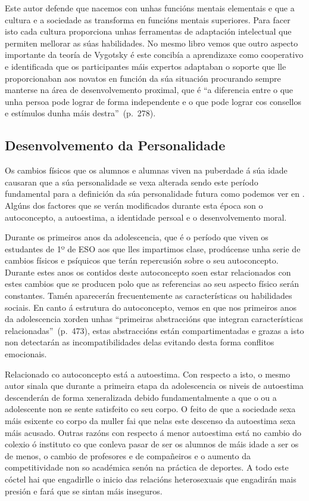 Este autor defende que nacemos con unhas funcións mentais elementais e que a cultura e a sociedade as transforma en funcións mentais superiores. Para facer isto cada cultura proporciona unhas ferramentas de adaptación intelectual que permiten mellorar as súas habilidades. No mesmo libro vemos que outro aspecto importante da teoría de Vygotsky é este concibía a aprendizaxe como cooperativo e identificada que os participantes máis expertos adaptaban o soporte que lle proporcionaban aos novatos en función da súa situación procurando sempre manterse na área de desenvolvemento proximal, que é ``a diferencia entre o que unha persoa pode lograr de forma independente e o que pode lograr cos consellos e estímulos dunha máis destra''~(p.~278).

\subsection{Desenvolvemento da Personalidade}
Os cambios físicos que os alumnos e alumnas viven na puberdade á súa idade causaran que a súa personalidade se vexa alterada sendo este período fundamental para a definición da súa personalidade futura como podemos ver en . Algúns dos factores que se verán modificados durante esta época son o autoconcepto, a autoestima, a identidade persoal e o desenvolvemento moral.

Durante os primeiros anos da adolescencia, que é o período que viven os estudantes de 1º de ESO aos que lles impartimos clase, prodúcense unha serie de cambios físicos e psíquicos que terán repercusión sobre o seu autoconcepto. Durante estes anos os contidos deste autoconcepto soen estar relacionados con estes cambios que se producen polo que as referencias ao seu aspecto físico serán constantes. Tamén aparecerán frecuentemente as características ou habilidades sociais. En canto á estrutura do autoconcepto, vemos en  que nos primeiros anos da adolescencia xorden unhas ``primeiras abstraccións que integran características relacionadas''~(p.~473), estas abstraccións están compartimentadas e grazas a isto non detectarán as incompatibilidades delas evitando desta forma conflitos emocionais.

Relacionado co autoconcepto está a autoestima. Con respecto a isto, o mesmo autor sinala que durante a primeira etapa da adolescencia os niveis de autoestima descenderán de forma xeneralizada debido fundamentalmente a que o ou a adolescente non se sente satisfeito co seu corpo. O feito de que a sociedade sexa máis esixente co corpo da muller fai que nelas este descenso da autoestima sexa máis acusado. Outras razóns con respecto á menor autoestima está no cambio do colexio ó instituto co que conleva pasar de ser os alumnos de máis idade a ser os de menos, o cambio de profesores e de compañeiros e o aumento da competitividade non so académica senón na práctica de deportes. A todo este cóctel hai que engadirlle o inicio das relacións heterosexuais que engadirán mais presión e fará que se sintan máis inseguros.

